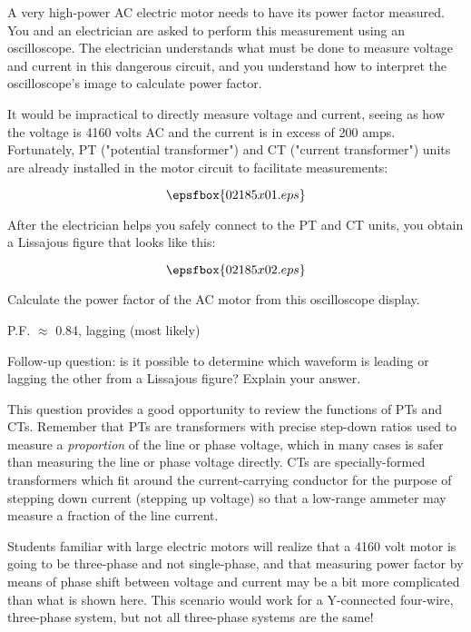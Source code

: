 

A very high-power AC electric motor needs to have its power factor measured.  You and an electrician are asked to perform this measurement using an oscilloscope.  The electrician understands what must be done to measure voltage and current in this dangerous circuit, and you understand how to interpret the oscilloscope's image to calculate power factor.

It would be impractical to directly measure voltage and current, seeing as how the voltage is 4160 volts AC and the current is in excess of 200 amps.  Fortunately, PT ("potential transformer") and CT ("current transformer") units are already installed in the motor circuit to facilitate measurements:

$$\epsfbox{02185x01.eps}$$

After the electrician helps you safely connect to the PT and CT units, you obtain a Lissajous figure that looks like this:

$$\epsfbox{02185x02.eps}$$

Calculate the power factor of the AC motor from this oscilloscope display.







P.F. $\approx$ 0.84, lagging (most likely)

\vskip 10pt

Follow-up question: is it possible to determine which waveform is leading or lagging the other from a Lissajous figure?  Explain your answer.







This question provides a good opportunity to review the functions of PTs and CTs.  Remember that PTs are transformers with precise step-down ratios used to measure a {\it proportion} of the line or phase voltage, which in many cases is safer than measuring the line or phase voltage directly.  CTs are specially-formed transformers which fit around the current-carrying conductor for the purpose of stepping down current (stepping up voltage) so that a low-range ammeter may measure a fraction of the line current.

Students familiar with large electric motors will realize that a 4160 volt motor is going to be three-phase and not single-phase, and that measuring power factor by means of phase shift between voltage and current may be a bit more complicated than what is shown here.  This scenario would work for a Y-connected four-wire, three-phase system, but not all three-phase systems are the same!




